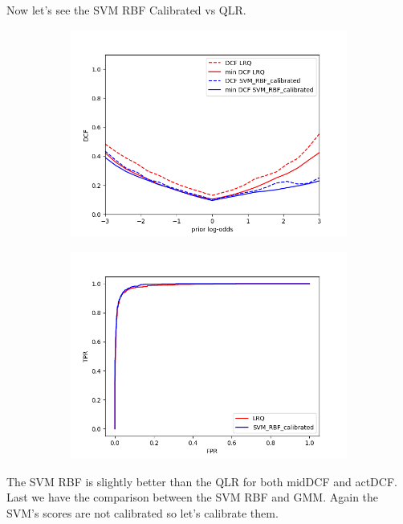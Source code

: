 \documentclass[english]{report}
\begin{document}
 Now let's see the SVM RBF Calibrated vs QLR\@.
\begin{figure}[H]
    \begin{subfigure}{0.5\textwidth}
        \includegraphics[scale=0.5]{../../images/comparison/validation/DCF_LRQ&SVM_RBF_calibrated}
    \end{subfigure}
    \begin{subfigure}{0.5\textwidth}
        \includegraphics[scale=0.5]{../../images/comparison/validation/ROC_LRQ&SVM_RBF_calibrated}
    \end{subfigure}
    \label{fig:SVMcalibvsMVG}
\end{figure}
The SVM RBF is slightly better than the QLR for both midDCF and actDCF.
Last we have the comparison between the SVM RBF and GMM. Again the SVM's scores are not calibrated so let's calibrate them.
\end{document}
